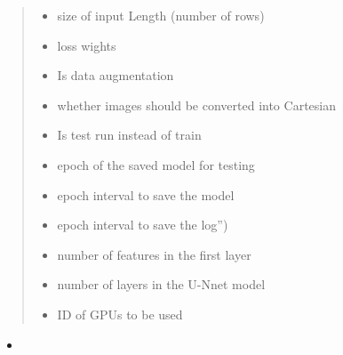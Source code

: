 \documentclass[letterpaper,10pt,english]{sphinxmanual}
\begin{document}
\begin{fulllineitems}
\begin{quote}
\begin{description}
\begin{itemize}
\item {} 
 \textendash{} size of input Length (number of rows)

\item {} 
 \textendash{} loss wights

\item {} 
 \textendash{} Is data augmentation

\item {} 
 \textendash{} whether images should be converted into Cartesian

\item {} 
 \textendash{} Is test run instead of train

\item {} 
 \textendash{} epoch of the saved model for testing

\item {} 
 \textendash{} epoch interval to save the model

\item {} 
 \textendash{} epoch interval to save the log”)

\item {} 
 \textendash{} number of features in the first layer

\item {} 
 \textendash{} number of layers in the U-Nnet model

\item {} 
 \textendash{} ID of GPUs to be used

\end{itemize}

\end{description}\end{quote}



\begin{itemize}
\item {} 
{\hyperref[\detokenize{index:unet.unet.unet_model}]{}}


\end{itemize}
\end{fulllineitems}
\end{document}
